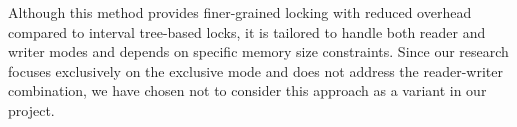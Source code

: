 Although this method provides finer-grained locking with reduced overhead compared to interval tree-based locks, it is tailored to handle both reader and writer modes and depends on specific memory size constraints. 
Since our research focuses exclusively on the exclusive mode and does not address the reader-writer combination, we have chosen not to consider this approach as a variant in our project.

